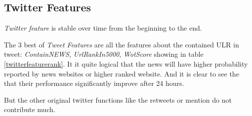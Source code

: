  \begin{table}[!h]
 \centering
{}
\caption{Rank of Part of Text Feature}
\label{testfeaturerank}
\end{table}
 \subsection{Twitter Features} 
   \emph{Twitter feature} is stable over time from the beginning to the end.

 The 3 best of \emph{Tweet Features} are all the features about the contained ULR in tweet: \emph{ContainNEWS}, \emph{UrlRankIn5000}, \emph{WotScore} showing in table \ref{twitterfeaturerank}. It it quite logical that the news will have higher probability reported by news websites or higher ranked website. And it is clear to see the that their performance significantly improve after 24 hours.
 

 But the other original twitter functions like the retweets or mention do not contribute much.
 


